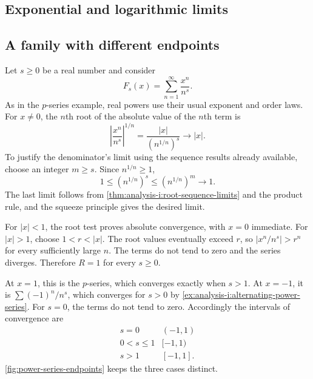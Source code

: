 




\subsection{Exponential and logarithmic limits}



\subsection{A family with different endpoints}

Let $s\ge0$ be a real number and consider
\[
  F_s(x)=\sum_{n=1}^{\infty}\frac{x^n}{n^s}.
\]
As in the $p$-series example, real powers use their usual exponent and
order laws. For $x\ne0$, the $n$th root of the absolute value of the
$n$th term is
\[
  \left|\frac{x^n}{n^s}\right|^{1/n}
  =\frac{|x|}{(n^{1/n})^s}\longrightarrow |x|.
\]
To justify the denominator's limit using the sequence results already
available, choose an integer $m\ge s$. Since $n^{1/n}\ge1$,
\[
  1\le(n^{1/n})^s\le(n^{1/n})^m\longrightarrow1.
\]
The last limit follows from \autoref{thm:analysis-i:root-sequence-limits}
and the product rule, and the squeeze principle gives the desired limit.

For $|x|<1$, the root test proves absolute convergence, with $x=0$
immediate. For $|x|>1$, choose $1<r<|x|$. The root values eventually
exceed $r$, so $|x^n/n^s|>r^n$ for every sufficiently large $n$.
The terms do not tend to zero and the series diverges. Therefore $R=1$
for every $s\ge0$.

\begin{marginfigure}
  \centering
  
  \caption[Three endpoint patterns for radius one.]{All three cases have radius $1$. Open or filled endpoint
    markers record the separate tests at $-1$ and $1$. The radius
    alone does not settle them.}
  \label{fig:power-series-endpoints}
\end{marginfigure}

At $x=1$, this is the $p$-series, which converges exactly when $s>1$.
At $x=-1$, it is $\sum(-1)^n/n^s$, which converges for $s>0$ by
\autoref{ex:analysis-i:alternating-power-series}. For $s=0$, the terms
do not tend to zero. Accordingly the intervals of convergence are
\[
  \begin{array}{c|c}
    s=0 & (-1,1)\\[3pt]
    0<s\le1 & [-1,1)\\[3pt]
    s>1 & [-1,1].
  \end{array}
\]
\autoref{fig:power-series-endpoints} keeps the three cases distinct.

